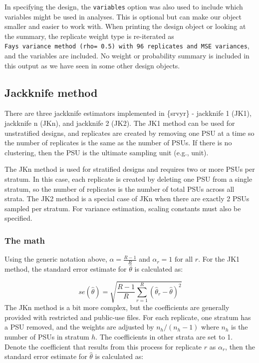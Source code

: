 \documentclass[
]{krantz}
\begin{document}
In specifying the design, the \texttt{variables} option was also used to include which variables might be used in analyses. This is optional but can make our object smaller and easier to work with. When printing the design object or looking at the summary, the replicate weight type is re-iterated as \texttt{Fay\textquotesingle{}s\ variance\ method\ (rho=\ 0.5)\ with\ 96\ replicates\ and\ MSE\ variances}, and the variables are included. No weight or probability summary is included in this output as we have seen in some other design objects.

\hypertarget{jackknife-method}{%
\subsection{Jackknife method}\label{jackknife-method}}

There are three jackknife estimators implemented in \{srvyr\} - jackknife 1 (JK1), jackknife n (JKn), and jackknife 2 (JK2). The JK1 method can be used for unstratified designs, and replicates are created by removing one PSU at a time so the number of replicates is the same as the number of PSUs. If there is no clustering, then the PSU is the ultimate sampling unit (e.g., unit).

The JKn method is used for stratified designs and requires two or more PSUs per stratum. In this case, each replicate is created by deleting one PSU from a single stratum, so the number of replicates is the number of total PSUs across all strata. The JK2 method is a special case of JKn when there are exactly 2 PSUs sampled per stratum. For variance estimation, scaling constants must also be specified.

\hypertarget{the-math-6}{%
\subsubsection*{The math}\label{the-math-6}}


Using the generic notation above, \(\alpha=\frac{R-1}{R}\) and \(\alpha_r=1 \text{ for all } r\). For the JK1 method, the standard error estimate for \(\hat{\theta}\) is calculated as:

\[se(\hat{\theta})=\sqrt{\frac{R-1}{R} \sum_{r=1}^R \left( \hat{\theta}_r-\hat{\theta}\right)^2}\]
The JKn method is a bit more complex, but the coefficients are generally provided with restricted and public-use files. For each replicate, one stratum has a PSU removed, and the weights are adjusted by \(n_h/(n_h-1)\) where \(n_h\) is the number of PSUs in stratum \(h\). The coefficients in other strata are set to 1. Denote the coefficient that results from this process for replicate \(r\) as \(\alpha_r\), then the standard error estimate for \(\hat{\theta}\) is calculated as:
\end{document}
